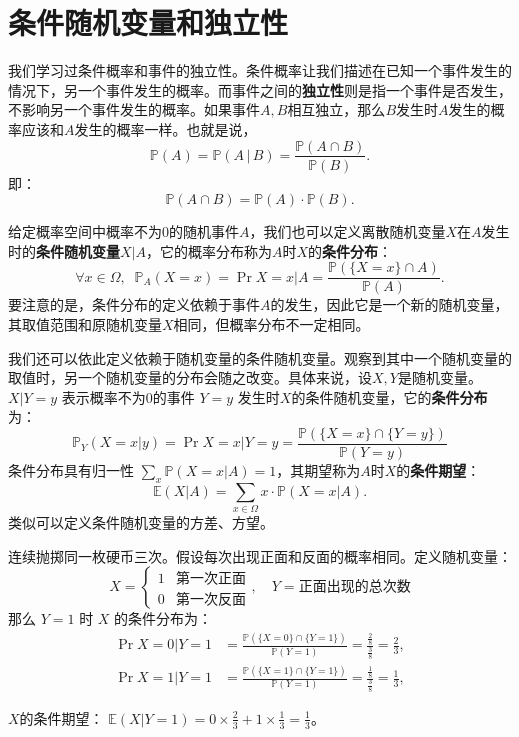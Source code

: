 \documentclass[12pt,UTF8]{ctexbook}
\begin{document}
\section{条件随机变量和独立性}

我们学习过条件概率和事件的独立性。条件概率让我们描述在已知一个事件发生的情况下，另一个事件发生的概率。而事件之间的\textbf{独立性}则是指一个事件是否发生，不影响另一个事件发生的概率。如果事件$A,B$相互独立，那么$B$发生时$A$发生的概率应该和$A$发生的概率一样。也就是说，
$$\mathbb{P}(A) = \mathbb{P}(A \, | \, B) = \frac{\mathbb{P}(A \cap B)}{\mathbb{P}(B)}.$$
即：
$$\mathbb{P}(A \cap B) = \mathbb{P}(A) \cdot \mathbb{P}(B).$$

给定概率空间中概率不为$0$的随机事件$A$，我们也可以定义离散随机变量$X$在$A$发生时的\textbf{条件随机变量}$X|A$，它的概率分布称为$A$时$X$的\textbf{条件分布}：
\[
\forall x \in \Omega,\;\;
\mathbb{P}_{A}(X = x) = \Pr{X=x | A} = \frac{\mathbb{P}(\{X = x\}\cap A)}{\mathbb{P}(A)}.
\]
要注意的是，条件分布的定义依赖于事件$A$的发生，因此它是一个新的随机变量，其取值范围和原随机变量$X$相同，但概率分布不一定相同。

我们还可以依此定义依赖于随机变量的条件随机变量。观察到其中一个随机变量的取值时，另一个随机变量的分布会随之改变。具体来说，设$X,Y$是随机变量。\(X|Y=y\) 表示概率不为$0$的事件 \(Y=y\) 发生时$X$的条件随机变量，它的\textbf{条件分布}为：
\[
\mathbb{P}_{Y}(X=x|y) = \Pr{X=x | Y=y} = \frac{\mathbb{P}(\{X=x\}\cap\{Y=y\})}{\mathbb{P}(Y=y)}
\]
条件分布具有归一性 \(\sum_x \mathbb{P}(X=x|A) = 1\)，其期望称为$A$时$X$的\textbf{条件期望}：
\[
\mathbb{E}(X|A) = \sum_{x\in \Omega} x \cdot \mathbb{P}(X=x|A).
\]
类似可以定义条件随机变量的方差、方望。

\begin{ex}
连续抛掷同一枚硬币三次。假设每次出现正面和反面的概率相同。定义随机变量：
\[
X = \begin{cases} 1 & \text{第一次正面} \\ 0 & \text{第一次反面} \end{cases}, \quad 
Y = \text{正面出现的总次数}
\]
那么 \(Y=1\) 时 \(X\) 的条件分布为：
\begin{align*}
    \Pr{X=0|Y=1} &= \frac{\mathbb{P}(\{X=0\}\cap\{Y=1\})}{\mathbb{P}(Y=1)} = \frac{\frac{2}{8}}{\frac{3}{8}} = \frac{2}{3},\\
    \Pr{X=1|Y=1} &= \frac{\mathbb{P}(\{X=1\}\cap\{Y=1\})}{\mathbb{P}(Y=1)} = \frac{\frac{1}{8}}{\frac{3}{8}} = \frac{1}{3},
\end{align*}

$X$的条件期望： \(\displaystyle\mathbb{E}(X|Y=1) = 0 \times \frac{2}{3} + 1 \times \frac{1}{3} = \frac{1}{3}\)。
\end{ex}
\end{document}
